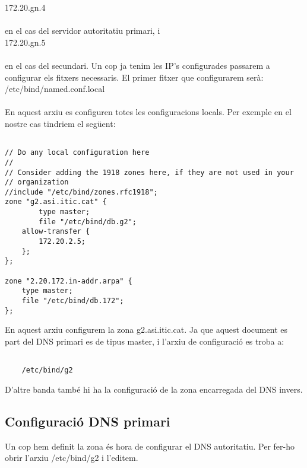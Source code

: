 \documentclass[11p]{article}
\begin{document}
	172.20.gn.4 \\
	\\
en el cas del servidor autoritatiu primari, i \\

	172.20.gn.5\\
	\\
en el cas del secundari. Un cop ja tenim les IP's configurades passarem a configurar els fitxers necessaris. El primer fitxer que configurarem serà:\\

	/etc/bind/named.conf.local\\
	\\

En aquest arxiu es configuren totes les configuracions locals. Per exemple en el nostre cas tindriem el següent:
	\\
\label{conf.zona}
\begin{lstlisting}

// Do any local configuration here
//
// Consider adding the 1918 zones here, if they are not used in your
// organization
//include "/etc/bind/zones.rfc1918";
zone "g2.asi.itic.cat" {
        type master;
        file "/etc/bind/db.g2";
	allow-transfer {
		172.20.2.5;
	};
};

zone "2.20.172.in-addr.arpa" {
	type master;
	file "/etc/bind/db.172";
};
\end{lstlisting}

En aquest arxiu configurem la zona g2.asi.itic.cat. Ja que aquest document es part del DNS primari es de tipus master, i l'arxiu de configuració es troba a:\\

\begin{lstlisting}
	
	/etc/bind/g2

\end{lstlisting}

D'altre banda també hi ha la configuració de la zona encarregada del DNS invers.
\newpage 
\subsection{Configuració DNS primari}

Un cop hem definit la zona és hora de configurar el DNS autoritatiu. Per fer-ho obrir l'arxiu /etc/bind/g2 i l'editem.
\end{document}
